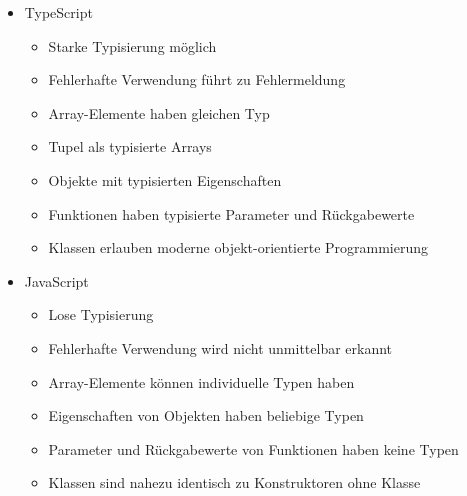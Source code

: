 \documentclass[10pt]{article}
\begin{document}
    \begin{tcolorbox}[
    colback=Yellow!5!white,
    colframe=Yellow!75!black,
    title={\centering Vergleich TypeScript - JavaScript}]
    \begin{itemize}
        \item TypeScript
        \begin{itemize}
            \item Starke Typisierung möglich
            \item Fehlerhafte Verwendung führt zu Fehlermeldung
            \item Array-Elemente haben gleichen Typ
            \item Tupel als typisierte Arrays
            \item Objekte mit typisierten Eigenschaften
            \item Funktionen haben typisierte Parameter und Rückgabewerte
            \item Klassen erlauben moderne objekt-orientierte Programmierung
        \end{itemize}
        \item JavaScript
        \begin{itemize}
            \item Lose Typisierung
            \item Fehlerhafte Verwendung wird nicht unmittelbar erkannt
            \item Array-Elemente können individuelle Typen haben
            \item Eigenschaften von Objekten haben beliebige Typen
            \item Parameter und Rückgabewerte von Funktionen haben keine Typen
            \item Klassen sind nahezu identisch zu Konstruktoren ohne Klasse
        \end{itemize}
    \end{itemize}
    \end{tcolorbox}
\end{document}
